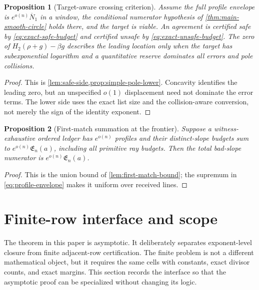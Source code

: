 \documentclass[12pt,a4paper]{amsart}
\numberwithin{equation}{section}
\newtheorem{proposition}[proposition]{Proposition}
\theoremstyle{remark}
\newcommand{\barN}{\overline N}
\newcommand{\Hb}{H_2}
\begin{document}
\begin{proposition}[Target-aware crossing criterion]\label{prop:entropy-crossing-detail}
Assume the full profile envelope is \(e^{o(n)}\barN_1\) in a window,
the conditional numerator hypothesis of
\cref{thm:main-smooth-circle} holds there, and the target
is viable.  An agreement is certified safe by
\eqref{eq:exact-safe-budget} and certified unsafe by
\eqref{eq:exact-unsafe-budget}.  The zero of
\(\Hb(\rho+g)-\beta g\) describes the leading location only when the
target has subexponential logarithm and a quantitative reserve dominates
all errors and pole collisions.
\end{proposition}

\begin{proof}
This is \cref{lem:safe-side,prop:simple-pole-lower}.  Concavity identifies
the leading zero, but an unspecified \(o(1)\) displacement need not
dominate the error terms.  The lower side uses the exact list size and the
collision-aware conversion, not merely the sign of the identity exponent.
\end{proof}

\begin{proposition}[First-match summation at the frontier]\label{prop:first-match-sum-detail}
Suppose a witness-exhaustive ordered ledger has \(e^{o(n)}\) profiles and their
distinct-slope budgets sum to \(e^{o(n)}\mathfrak E_n(a)\), including all
primitive ray budgets.  Then the total bad-slope numerator is
\(e^{o(n)}\mathfrak E_n(a)\).
\end{proposition}

\begin{proof}
This is the union bound of \cref{lem:first-match-bound}; the supremum in
\eqref{eq:profile-envelope} makes it uniform over received lines.
\end{proof}

\section{Finite-row interface and scope}\label{sec:finite-interface}

The theorem in this paper is asymptotic.  It deliberately separates exponent-level closure from finite adjacent-row certification.  The finite problem is not a different mathematical object, but it requires the same cells with constants, exact divisor counts, and exact margins.  This section records the interface so that the asymptotic proof can be specialized without changing its logic.
\end{document}
